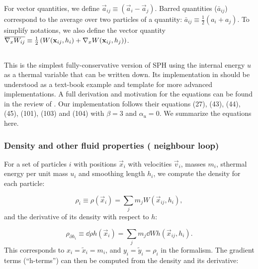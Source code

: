 For vector quantities, we define $\vec{a}_{ij} \equiv (\vec{a}_i -
\vec{a}_j)$. Barred quantities ($\bar a_{ij}$) correspond to the
average over two particles of a quantity: $\bar a_{ij} \equiv
\frac{1}{2}(a_i + a_j)$. To simplify notations, we also define the
vector quantity $\overline{\nabla_xW_{ij}} \equiv \frac{1}{2}\left(W({\mathbf{x}}_{ij}, h_i) +
\nabla_x W({\mathbf{x}}_{ij},h_j)\right)$.


\subsection{\MinimalSPH}
\label{sec:sph:minimal}

This is the simplest fully-conservative version of SPH using the
internal energy $u$ as a thermal variable that can be written
down. Its implementation in \swift should be understood as a text-book
example and template for more advanced implementations. A full
derivation and motivation for the equations can be found in the review
of \cite{Price2012}. Our implementation follows their equations (27),
(43), (44), (45), (101), (103) and (104) with $\beta=3$ and
$\alpha_u=0$. We summarize the equations here.

\subsubsection{Density and other fluid properties ( neighbour loop)}

For a set of particles $i$ with positions $\vec{x}_i$ with velocities
$\vec{v}_i$, masses $m_i$, sthermal energy per unit mass $u_i$ and
smoothing length $h_i$, we compute the density for each particle:

\begin{equation}
  \rho_i \equiv \rho(\vec{x}_i) = \sum_j m_j W(\vec{x}_{ij}, h_i),
  \label{eq:sph:minimal:rho}
\end{equation}
and the derivative of its density with respect to $h$:

\begin{equation}
    \label{eq:sph:minimal:rho_dh}
  \rho_{\partial h_i} \equiv \dd{\rho}{h}(\vec{x}_i) = \sum_j m_j \dd{W}{h}(\vec{x}_{ij}
  , h_i).
\end{equation}
This corresponds to $x_i = \tilde{x}_i = m_i$, and $y_i =\tilde{y}_i = \rho_i$
in the \citet{hopkins2013} formalism.  The gradient terms (``h-terms'') can
then be computed from the density and its derivative:

